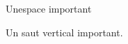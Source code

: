 \documentclass[12pt,a4paper,twoside]{article}
\begin{document}
Un\hspace{10cm}espace important

\vspace{0.5cm}
Un saut vertical important.
\end{document}
